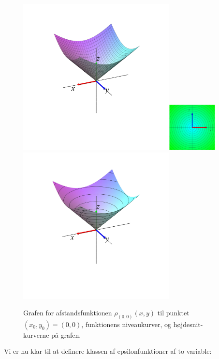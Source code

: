 \begin{figure}[h]
\centerline{\includegraphics[height=80mm]{plotDist.pdf}\quad \includegraphics[height=25mm]{plotDistNiveau.pdf} \quad \includegraphics[height=80mm]{plotDistNiveauUP.pdf}}
\begin{center}
\caption{Grafen for afstandsfunktionen  $\rho_{(0,0)}(x,y)$ til punktet $(x_{0}, y_{0}) = (0,0)$, funktionens niveaukurver, og højdesnit-kurverne på grafen.} \label{figDist}
\end{center}
\end{figure}


Vi er nu klar til at definere klassen af epsilonfunktioner af to variable:

